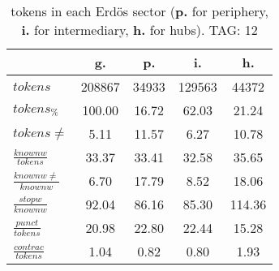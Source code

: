 \begin{table}[h!]
\begin{center}
\begin{tabular}{| l | c | c | c | c |}\hline
 & g. & p. & i. & h. \\\hline
$tokens$ & 208867  & 34933  & 129563  & 44372 \\\hline
$tokens_{\%}$ & 100.00  & 16.72  & 62.03  & 21.24 \\\hline
$tokens \neq$ & 5.11  & 11.57  & 6.27  & 10.78 \\\hline
$\frac{knownw}{tokens}$ & 33.37  & 33.41  & 32.58  & 35.65 \\\hline
$\frac{knownw \neq}{knownw}$ & 6.70  & 17.79  & 8.52  & 18.06 \\\hline
$\frac{stopw}{knownw}$ & 92.04  & 86.16  & 85.30  & 114.36 \\\hline
$\frac{punct}{tokens}$ & 20.98  & 22.80  & 22.44  & 15.28 \\\hline
$\frac{contrac}{tokens}$ & 1.04  & 0.82  & 0.80  & 1.93 \\\hline
\end{tabular}
\caption{tokens in each Erd\"os sector ({{\bf p.}} for periphery, {{\bf i.}} for intermediary, 
    {{\bf h.}} for hubs). TAG: 12}
\end{center}
\end{table}